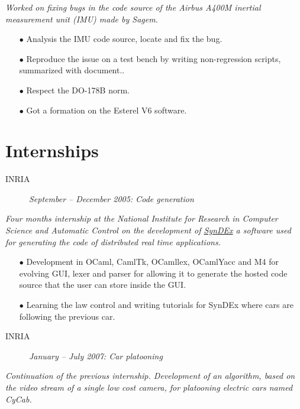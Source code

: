 \documentclass{crcv}
\newcommand{\desc}[4]{
\begin{description}
\item[\textcolor{fortitle}{#1}]\hspace*{\fill}\textit{\textcolor{fortitle}{#2 -- #3: #4}}\\
\end{description}
}
\begin{document}
\textit{Worked on fixing bugs in the code source of the Airbus A400M
  inertial measurement unit (IMU) made by Sagem.}

\begin{itemize}
\item[$\bullet$] Analysis the IMU code source, locate and fix the bug.
\item[$\bullet$] Reproduce the issue on a test bench by writing
  non-regression scripts, summarized with document..
\item[$\bullet$] Respect the DO-178B norm.
\item[$\bullet$] Got a formation on the Esterel V6 software.
\end{itemize}

\section{\textcolor{fortitle}{Int}ernships}

\desc{INRIA}{September}{December 2005}{Code generation}

\textit{Four months internship at the National Institute for Research
  in Computer Science and Automatic Control on the development of
  \href{http://www.syndex.org/}{SynDEx} a software used for generating
  the code of distributed real time applications.}

\begin{itemize}
\item[$\bullet$] Development in OCaml, CamlTk, OCamllex, OCamlYacc and
  M4 for evolving GUI, lexer and parser for allowing it to generate
  the hosted code source that the user can store inside the GUI.
\item[$\bullet$] Learning the law control and writing tutorials for
  SynDEx where cars are following the previous car.
\end{itemize}

\desc{INRIA}{January}{July 2007}{Car platooning}

\textit{Continuation of the previous internship. Development of an
  algorithm, based on the video stream of a single low cost camera,
  for platooning electric cars named CyCab.}
\end{document}
